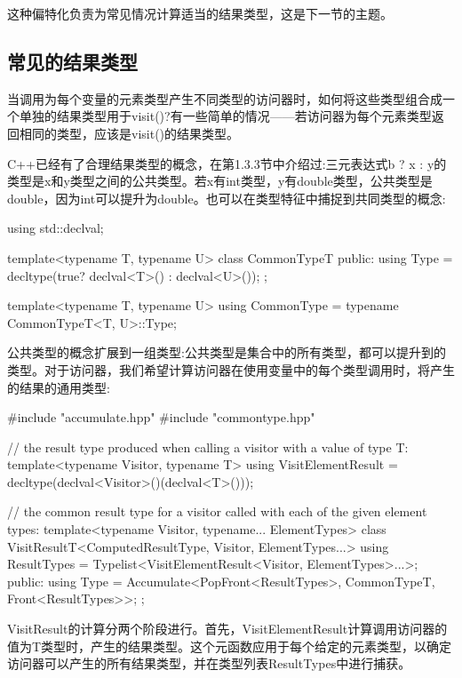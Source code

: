 这种偏特化负责为常见情况计算适当的结果类型，这是下一节的主题。

\subsection{常见的结果类型}

当调用为每个变量的元素类型产生不同类型的访问器时，如何将这些类型组合成一个单独的结果类型用于visit()?有一些简单的情况——若访问器为每个元素类型返回相同的类型，应该是visit()的结果类型。

C++已经有了合理结果类型的概念，在第1.3.3节中介绍过:三元表达式b ? x : y的类型是x和y类型之间的公共类型。若x有int类型，y有double类型，公共类型是double，因为int可以提升为double。也可以在类型特征中捕捉到共同类型的概念:

\begin{cpp}
using std::declval;

template<typename T, typename U>
class CommonTypeT
{
	public:
	using Type = decltype(true? declval<T>() : declval<U>());
};

template<typename T, typename U>
using CommonType = typename CommonTypeT<T, U>::Type;
\end{cpp}

公共类型的概念扩展到一组类型:公共类型是集合中的所有类型，都可以提升到的类型。对于访问器，我们希望计算访问器在使用变量中的每个类型调用时，将产生的结果的通用类型:

\begin{cpp}
#include "accumulate.hpp"
#include "commontype.hpp"

// the result type produced when calling a visitor with a value of type T:
template<typename Visitor, typename T>
using VisitElementResult = decltype(declval<Visitor>()(declval<T>()));

// the common result type for a visitor called with each of the given element types:
template<typename Visitor, typename... ElementTypes>
class VisitResultT<ComputedResultType, Visitor, ElementTypes...>
{
	using ResultTypes =
		Typelist<VisitElementResult<Visitor, ElementTypes>...>;
	public:
	using Type =
		Accumulate<PopFront<ResultTypes>, CommonTypeT, Front<ResultTypes>>;
};
\end{cpp}

VisitResult的计算分两个阶段进行。首先，VisitElementResult计算调用访问器的值为T类型时，产生的结果类型。这个元函数应用于每个给定的元素类型，以确定访问器可以产生的所有结果类型，并在类型列表ResultTypes中进行捕获。

